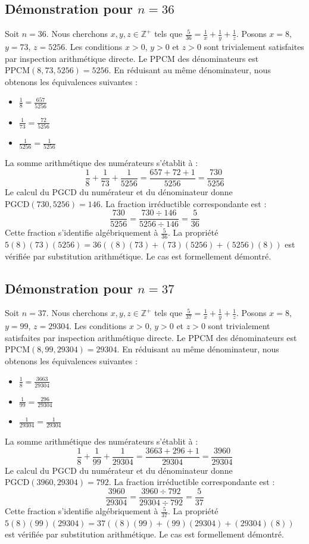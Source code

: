 \documentclass[12pt,a4paper]{article}
\begin{document}
\subsection{Démonstration pour $n = 36$}
Soit $n = 36$. Nous cherchons $x, y, z \in \mathbb{Z}^{+}$ tels que $\frac{5}{36} = \frac{1}{x} + \frac{1}{y} + \frac{1}{z}$.
Posons $x = 8$, $y = 73$, $z = 5256$.
Les conditions $x > 0$, $y > 0$ et $z > 0$ sont trivialement satisfaites par inspection arithmétique directe.
Le PPCM des dénominateurs est $\text{PPCM}(8, 73, 5256) = 5256$.
En réduisant au même dénominateur, nous obtenons les équivalences suivantes :
\begin{itemize}
    \item $\frac{1}{8} = \frac{657}{5256}$
    \item $\frac{1}{73} = \frac{72}{5256}$
    \item $\frac{1}{5256} = \frac{1}{5256}$
\end{itemize}
La somme arithmétique des numérateurs s'établit à :
$$ \frac{1}{8} + \frac{1}{73} + \frac{1}{5256} = \frac{657 + 72 + 1}{5256} = \frac{730}{5256} $$
Le calcul du PGCD du numérateur et du dénominateur donne $\text{PGCD}(730, 5256) = 146$.
La fraction irréductible correspondante est :
$$ \frac{730}{5256} = \frac{730 \div 146}{5256 \div 146} = \frac{5}{36} $$
Cette fraction s'identifie algébriquement à $\frac{5}{36}$.
La propriété $5(8)(73)(5256) = 36((8)(73) + (73)(5256) + (5256)(8))$ est vérifiée par substitution arithmétique.
Le cas est formellement démontré.

\subsection{Démonstration pour $n = 37$}
Soit $n = 37$. Nous cherchons $x, y, z \in \mathbb{Z}^{+}$ tels que $\frac{5}{37} = \frac{1}{x} + \frac{1}{y} + \frac{1}{z}$.
Posons $x = 8$, $y = 99$, $z = 29304$.
Les conditions $x > 0$, $y > 0$ et $z > 0$ sont trivialement satisfaites par inspection arithmétique directe.
Le PPCM des dénominateurs est $\text{PPCM}(8, 99, 29304) = 29304$.
En réduisant au même dénominateur, nous obtenons les équivalences suivantes :
\begin{itemize}
    \item $\frac{1}{8} = \frac{3663}{29304}$
    \item $\frac{1}{99} = \frac{296}{29304}$
    \item $\frac{1}{29304} = \frac{1}{29304}$
\end{itemize}
La somme arithmétique des numérateurs s'établit à :
$$ \frac{1}{8} + \frac{1}{99} + \frac{1}{29304} = \frac{3663 + 296 + 1}{29304} = \frac{3960}{29304} $$
Le calcul du PGCD du numérateur et du dénominateur donne $\text{PGCD}(3960, 29304) = 792$.
La fraction irréductible correspondante est :
$$ \frac{3960}{29304} = \frac{3960 \div 792}{29304 \div 792} = \frac{5}{37} $$
Cette fraction s'identifie algébriquement à $\frac{5}{37}$.
La propriété $5(8)(99)(29304) = 37((8)(99) + (99)(29304) + (29304)(8))$ est vérifiée par substitution arithmétique.
Le cas est formellement démontré.
\end{document}
